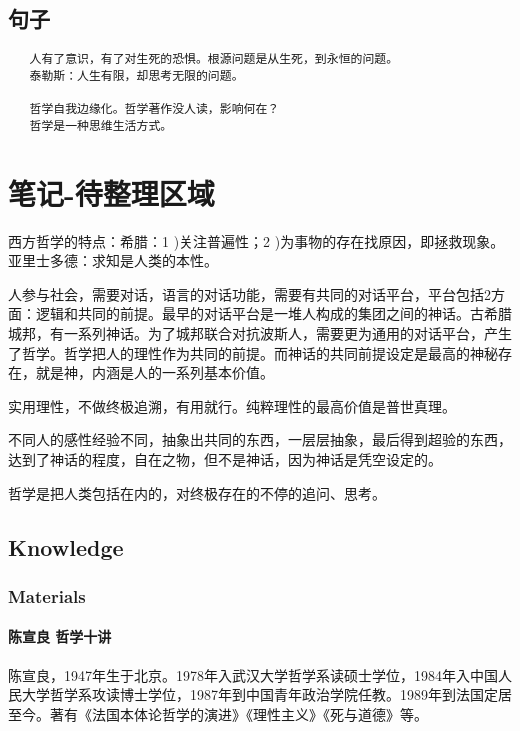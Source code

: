 \documentclass[UTF8]{../RepresentationUniverse}
\begin{document}
\section{句子}


\begin{lstlisting}
   人有了意识，有了对生死的恐惧。根源问题是从生死，到永恒的问题。
   泰勒斯：人生有限，却思考无限的问题。

   哲学自我边缘化。哲学著作没人读，影响何在？
   哲学是一种思维生活方式。

\end{lstlisting}

\chapter{笔记-待整理区域}


西方哲学的特点：希腊：1 )关注普遍性；2 )为事物的存在找原因，即拯救现象。
亚里士多德：求知是人类的本性。


人参与社会，需要对话，语言的对话功能，需要有共同的对话平台，平台包括2方面：逻辑和共同的前提。最早的对话平台是一堆人构成的集团之间的神话。古希腊城邦，有一系列神话。为了城邦联合对抗波斯人，需要更为通用的对话平台，产生了哲学。哲学把人的理性作为共同的前提。而神话的共同前提设定是最高的神秘存在，就是神，内涵是人的一系列基本价值。

实用理性，不做终极追溯，有用就行。纯粹理性的最高价值是普世真理。

不同人的感性经验不同，抽象出共同的东西，一层层抽象，最后得到超验的东西，达到了神话的程度，自在之物，但不是神话，因为神话是凭空设定的。

哲学是把人类包括在内的，对终极存在的不停的追问、思考。

\section{Knowledge}

\subsection{Materials}

\subsubsection{ 陈宣良 哲学十讲}
陈宣良，1947年生于北京。1978年入武汉大学哲学系读硕士学位，1984年入中国人民大学哲学系攻读博士学位，1987年到中国青年政治学院任教。1989年到法国定居至今。著有《法国本体论哲学的演进》《理性主义》《死与道德》等。
\end{document}
